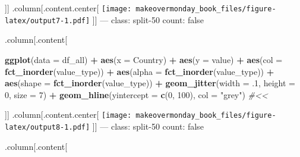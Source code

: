 \documentclass[]{book}
\newenvironment{Shaded}{\begin{snugshade}}{\end{snugshade}}
\newcommand{\KeywordTok}[1]{\textcolor[rgb]{0.13,0.29,0.53}{\textbf{#1}}}
\newcommand{\DataTypeTok}[1]{\textcolor[rgb]{0.13,0.29,0.53}{#1}}
\newcommand{\DecValTok}[1]{\textcolor[rgb]{0.00,0.00,0.81}{#1}}
\newcommand{\StringTok}[1]{\textcolor[rgb]{0.31,0.60,0.02}{#1}}
\newcommand{\CommentTok}[1]{\textcolor[rgb]{0.56,0.35,0.01}{\textit{#1}}}
\newcommand{\OperatorTok}[1]{\textcolor[rgb]{0.81,0.36,0.00}{\textbf{#1}}}
\newcommand{\NormalTok}[1]{#1}
\theoremstyle{definition}
\theoremstyle{definition}
\theoremstyle{definition}
\theoremstyle{remark}
\begin{document}
{]}{]} .column{[}.content.center{[}
\texttt{[image: makeovermonday\_book\_files/figure-latex/output7-1.pdf]}
{]}{]} --- class: split-50 count: false

.column{[}.content{[}

\begin{Shaded}
\begin{Highlighting}[]
\KeywordTok{ggplot}\NormalTok{(}\DataTypeTok{data =}\NormalTok{ df_all) }\OperatorTok{+}
\StringTok{  }\KeywordTok{aes}\NormalTok{(}\DataTypeTok{x =}\NormalTok{ Country) }\OperatorTok{+}
\StringTok{  }\KeywordTok{aes}\NormalTok{(}\DataTypeTok{y =}\NormalTok{ value) }\OperatorTok{+}
\StringTok{  }\KeywordTok{aes}\NormalTok{(}\DataTypeTok{col =} \KeywordTok{fct_inorder}\NormalTok{(value_type)) }\OperatorTok{+}
\StringTok{  }\KeywordTok{aes}\NormalTok{(}\DataTypeTok{alpha =} \KeywordTok{fct_inorder}\NormalTok{(value_type)) }\OperatorTok{+}
\StringTok{  }\KeywordTok{aes}\NormalTok{(}\DataTypeTok{shape =} \KeywordTok{fct_inorder}\NormalTok{(value_type)) }\OperatorTok{+}
\StringTok{  }\KeywordTok{geom_jitter}\NormalTok{(}\DataTypeTok{width =}\NormalTok{ .}\DecValTok{1}\NormalTok{, }\DataTypeTok{height =} \DecValTok{0}\NormalTok{, }\DataTypeTok{size =} \DecValTok{7}\NormalTok{) }\OperatorTok{+}
\StringTok{  }\KeywordTok{geom_hline}\NormalTok{(}\DataTypeTok{yintercept =} \KeywordTok{c}\NormalTok{(}\DecValTok{0}\NormalTok{, }\DecValTok{100}\NormalTok{), }\DataTypeTok{col =} \StringTok{"grey"}\NormalTok{)  }\CommentTok{#<<}
\end{Highlighting}
\end{Shaded}

{]}{]} .column{[}.content.center{[}
\texttt{[image: makeovermonday\_book\_files/figure-latex/output8-1.pdf]}
{]}{]} --- class: split-50 count: false

.column{[}.content{[}
\end{document}
